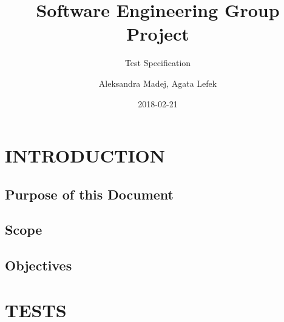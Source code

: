 \documentclass{project}
\begin{document}
\title{Software Engineering Group Project}
\subtitle{Test Specification}
\author{Aleksandra Madej, Agata Lefek}     
\date{2018-02-21}
\maketitle
\tableofcontents
\newpage

\section{INTRODUCTION}

\subsection{Purpose of this Document}

\subsection{Scope}

\subsection{Objectives}

\section{TESTS}
\end{document}
